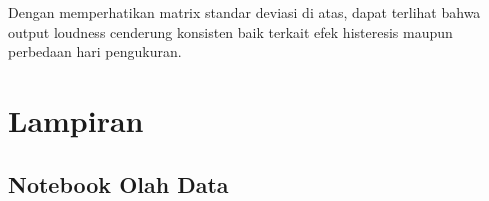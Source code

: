 \documentclass[12pt,]{article}
\begin{document}
	Dengan memperhatikan matrix standar deviasi di atas, dapat terlihat bahwa output loudness cenderung konsisten
	baik terkait efek histeresis maupun perbedaan hari pengukuran.

	\newpage
	\section{Lampiran}
	
	\subsection{Notebook Olah Data}
	
	
\end{document}
